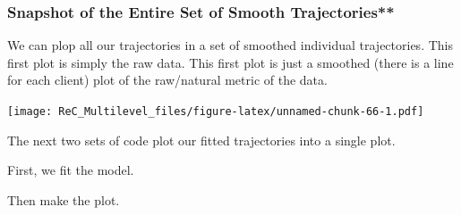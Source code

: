 \documentclass[
  11pt,
]{book}
\newenvironment{Shaded}{\begin{snugshade}}{\end{snugshade}}
\newcommand{\AttributeTok}[1]{\textcolor[rgb]{0.77,0.63,0.00}{#1}}
\newcommand{\CommentTok}[1]{\textcolor[rgb]{0.56,0.35,0.01}{\textit{#1}}}
\newcommand{\ControlFlowTok}[1]{\textcolor[rgb]{0.13,0.29,0.53}{\textbf{#1}}}
\newcommand{\FunctionTok}[1]{\textcolor[rgb]{0.00,0.00,0.00}{#1}}
\newcommand{\NormalTok}[1]{#1}
\newcommand{\OtherTok}[1]{\textcolor[rgb]{0.56,0.35,0.01}{#1}}
\newcommand{\SpecialCharTok}[1]{\textcolor[rgb]{0.00,0.00,0.00}{#1}}
\newcommand{\StringTok}[1]{\textcolor[rgb]{0.31,0.60,0.02}{#1}}
\begin{document}
\hypertarget{snapshot-of-the-entire-set-of-smooth-trajectories}{%
\subsubsection{Snapshot of the Entire Set of Smooth Trajectories**}\label{snapshot-of-the-entire-set-of-smooth-trajectories}}

We can plop all our trajectories in a set of smoothed individual trajectories. This first plot is simply the raw data. This first plot is just a smoothed (there is a line for each client) plot of the raw/natural metric of the data.

\begin{Shaded}
\end{Shaded}

\texttt{[image: ReC\_Multilevel\_files/figure-latex/unnamed-chunk-66-1.pdf]}

The next two sets of code plot our fitted trajectories into a single plot.

First, we fit the model.

\begin{Shaded}
\end{Shaded}

Then make the plot.

\begin{Shaded}
\end{Shaded}
\end{document}
